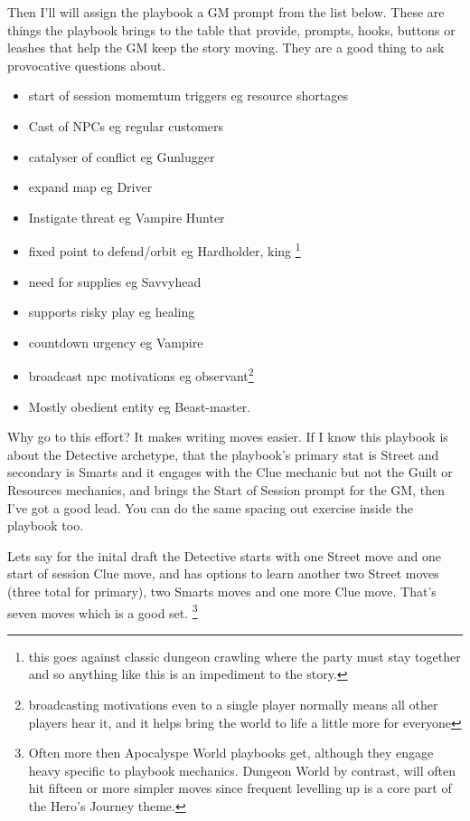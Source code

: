\documentclass{tufte-handout}
\begin{document}
Then I'll will assign the playbook a GM prompt from the list below. These are things the playbook brings to the table that provide, prompts, hooks, buttons or leashes that help the GM keep the story moving.  They are a good thing to ask provocative questions about.

\begin{itemize}
\item start of session momemtum triggers eg resource shortages
\item Cast of NPCs  eg regular customers
\item catalyser of conflict eg Gunlugger
\item expand map eg Driver
\item Instigate threat eg Vampire Hunter
\item fixed point to defend/orbit eg Hardholder, king \footnote{this goes against classic dungeon crawling where the party must stay together and so anything like this is an impediment to the story.}
\item need for supplies eg Savvyhead
\item supports risky play eg healing
\item countdown urgency eg Vampire
\item broadcast npc motivations eg observant\footnote{broadcasting motivations even to a single player normally means all other players hear it, and it helps bring the world to life a little more for everyone}
\item Mostly obedient entity eg Beast-master.
\end{itemize}

Why go to this effort? It makes writing moves easier. If I know this playbook is about the Detective archetype, that the playbook's primary stat is Street and secondary is Smarts and it engages with the Clue mechanic but not the Guilt or Resources mechanics, and brings the Start of Session prompt for the GM, then I've got a good lead. You can do the same spacing out exercise inside the playbook too. 

Lets say for the inital draft the Detective starts with one Street move and one start of session Clue move, and has options to learn another two Street moves (three total for primary), two Smarts moves and one more Clue move. That's seven moves which is a good set. \footnote{ Often more then Apocalyspe World playbooks get, although they engage heavy specific to playbook mechanics. Dungeon World by contrast, will often hit fifteen or more simpler moves since frequent levelling up is a core part of the Hero's Journey theme.}
\end{document}

